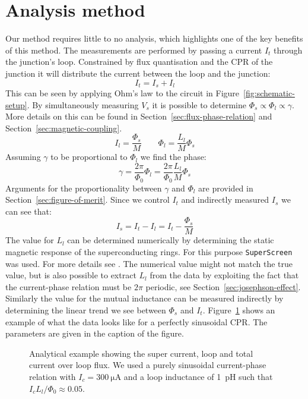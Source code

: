 \section{Analysis method}
\label{sec:analysis-method}
Our method requires little to no analysis, which highlights one of the key benefits of this method. The measurements are performed by passing a current $I_t$ through the junction's loop. Constrained by flux quantisation and the CPR of the junction it will distribute the current between the loop and the junction:
\begin{equation}
	I_t = I_s + I_l
\end{equation}
This can be seen by applying Ohm's law to the circuit in Figure~\ref{fig:schematic-setup}. By simultaneously measuring $V_s$ it is possible to determine $\Phi_s \propto \Phi_l \propto \gamma$. More details on this can be found in Section~\ref{sec:flux-phase-relation} and Section~\ref{sec:magnetic-coupling}.
\begin{equation}
	I_l = \frac{\Phi_s}{M} \qquad \Phi_l = \frac{L_l}{M}\Phi_s
\end{equation}
Assuming $\gamma$ to be proportional to $\Phi_l$ we find the phase:
\begin{equation}
	\gamma = \frac{2\pi}{\Phi_0}\Phi_l = \frac{2\pi}{\Phi_0}\frac{L_l}{M}\Phi_s
\end{equation}
Arguments for the proportionality between $\gamma$ and $\Phi_l$ are provided in Section~\ref{sec:figure-of-merit}. Since we control $I_t$ and indirectly measured $I_s$ we can see that:
\begin{equation}
	I_s = I_t - I_l = I_t - \frac{\Phi_s}{M}
\end{equation}
The value for $L_l$ can be determined numerically by determining the static magnetic response of the superconducting rings. For this purpose \texttt{SuperScreen} was used. For more details see \cite{bishop-vanhornSuperScreenOpensourcePackage2022}. The numerical value might not match the true value, but is also possible to extract $L_l$ from the data by exploiting the fact that the current-phase relation must be $2\pi$ periodic, see Section~\ref{sec:josephson-effect}. Similarly the value for the mutual inductance can be measured indirectly by determining the linear trend we see between $\Phi_s$ and $I_t$. Figure~\ref{fig:sinusoidal-CPR-prediction} shows an example of what the data looks like for a perfectly sinusoidal CPR. The parameters are given in the caption of the figure. 

\begin{figure}[ht!]
	\centering
	
	\caption{Analytical example showing the super current, loop and total current over loop flux. We used a purely sinusoidal current-phase relation with $I_c=\qty{300}{\micro\ampere}$ and a loop inductance of \qty{1}{\pico\henry} such that $I_c L_l / \Phi_0 \approx 0.05$.}
	\label{fig:sinusoidal-CPR-prediction}
\end{figure}

